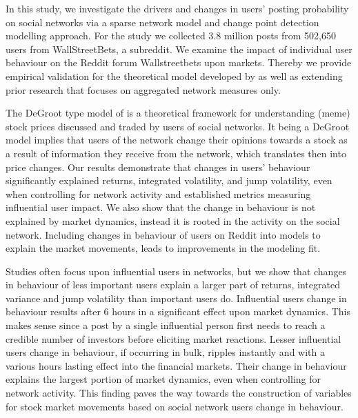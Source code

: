 
In this study, we investigate the drivers and changes in users' posting probability on social networks via a sparse network model and change point detection modelling approach. For the study we collected 3.8 million posts from 502,650 users from WallStreetBets, a subreddit. We examine the impact of individual user behaviour on the Reddit forum Wallstreetbets upon markets. Thereby we provide empirical validation for the theoretical model developed by \citet{Pedersen2022} as well as extending prior research that focuses on aggregated network measures only. 

The DeGroot type model of \citet{Pedersen2022} is a theoretical framework for understanding (meme) stock prices discussed and traded by users of social networks. It being a DeGroot model implies that users of the network change their opinions towards a stock as a result of information they receive from the network, which translates then into price changes. 
Our results demonstrate that changes in users' behaviour significantly explained returns, integrated volatility, and jump volatility, even when controlling for network activity and established metrics measuring influential user impact. We also show that the change in behaviour is not explained by market dynamics, instead it is rooted in the activity on the social network. Including changes in behaviour of users on Reddit into models to explain the market movements, leads to improvements in the modeling fit.

Studies often focus upon influential users in networks, but we show that changes in behaviour of less important users explain a larger part of returns, integrated variance and jump volatility than important users do. Influential users change in behaviour results after 6 hours in a significant effect upon market dynamics. This makes sense since a post by a single influential person first needs to reach a credible number of investors before eliciting market reactions. Lesser influential users change in behaviour, if occurring in bulk, ripples instantly and with a various hours lasting effect into the financial markets. Their change in behaviour explains the largest portion of market dynamics, even when controlling for network activity. This finding paves the way towards the construction of variables for stock market movements based on social network users change in behaviour. 

